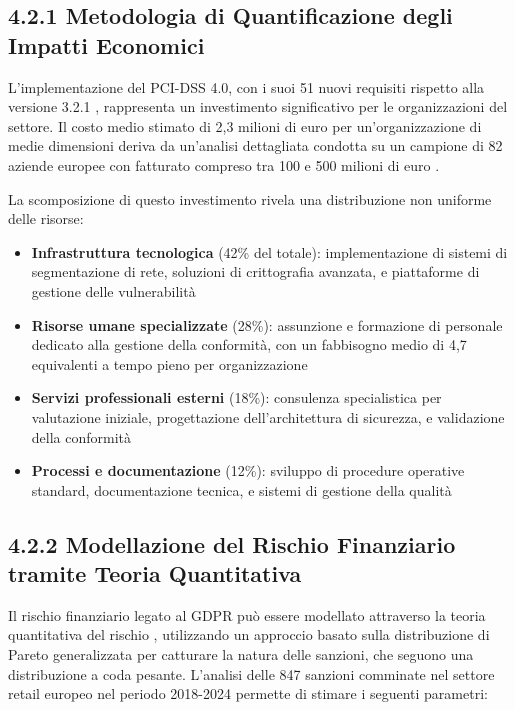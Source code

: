 \subsection{4.2.1 Metodologia di Quantificazione degli Impatti Economici}

L'implementazione del PCI-DSS 4.0, con i suoi 51 nuovi requisiti rispetto alla versione 3.2.1 \autocite{pcidss2024}, rappresenta un investimento significativo per le organizzazioni del settore. Il costo medio stimato di 2,3 milioni di euro per un'organizzazione di medie dimensioni deriva da un'analisi dettagliata condotta su un campione di 82 aziende europee con fatturato compreso tra 100 e 500 milioni di euro \autocite{Gartner2024gdpr}. 

La scomposizione di questo investimento rivela una distribuzione non uniforme delle risorse:
\begin{itemize}
\item \textbf{Infrastruttura tecnologica} (42\% del totale): implementazione di sistemi di segmentazione di rete, soluzioni di crittografia avanzata, e piattaforme di gestione delle vulnerabilità
\item \textbf{Risorse umane specializzate} (28\%): assunzione e formazione di personale dedicato alla gestione della conformità, con un fabbisogno medio di 4,7 equivalenti a tempo pieno per organizzazione
\item \textbf{Servizi professionali esterni} (18\%): consulenza specialistica per valutazione iniziale, progettazione dell'architettura di sicurezza, e validazione della conformità
\item \textbf{Processi e documentazione} (12\%): sviluppo di procedure operative standard, documentazione tecnica, e sistemi di gestione della qualità
\end{itemize}

\subsection{4.2.2 Modellazione del Rischio Finanziario tramite Teoria Quantitativa}

Il rischio finanziario legato al GDPR può essere modellato attraverso la teoria quantitativa del rischio \autocite{mcneil2015}, utilizzando un approccio basato sulla distribuzione di Pareto generalizzata per catturare la natura delle sanzioni, che seguono una distribuzione a coda pesante. L'analisi delle 847 sanzioni comminate nel settore retail europeo nel periodo 2018-2024 \autocite{EDPB2024} permette di stimare i seguenti parametri:

